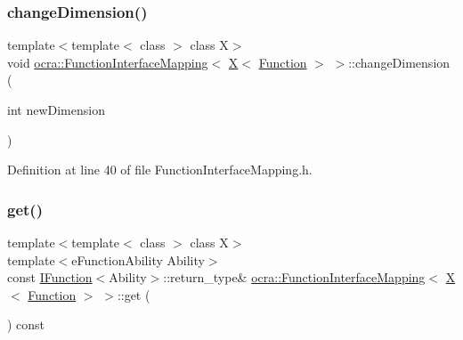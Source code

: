 \hypertarget{structocra_1_1FunctionInterfaceMapping_3_01X_3_01Function_01_4_01_4_aebf253ed862abb394f5586709002252e}{}\label{structocra_1_1FunctionInterfaceMapping_3_01X_3_01Function_01_4_01_4_aebf253ed862abb394f5586709002252e} 
\subsubsection{\texorpdfstring{change\+Dimension()}{changeDimension()}}
{\footnotesize\ttfamily template$<$template$<$ class $>$ class X$>$ \\
void \hyperlink{structocra_1_1FunctionInterfaceMapping}{ocra\+::\+Function\+Interface\+Mapping}$<$ \hyperlink{namespaceocra_a436781c7059a0f76027df1c652126260a53f3cfeeb322946db40cd86dfebfb237}{X}$<$ \hyperlink{classocra_1_1Function}{Function} $>$ $>$\+::change\+Dimension (\begin{DoxyParamCaption}\item[{int}]{new\+Dimension }\end{DoxyParamCaption})\hspace{0.3cm}{\ttfamily [inline]}}



Definition at line 40 of file Function\+Interface\+Mapping.\+h.

\hypertarget{structocra_1_1FunctionInterfaceMapping_3_01X_3_01Function_01_4_01_4_af42a6175afbf22787ab4dd7dab5b0152}{}\label{structocra_1_1FunctionInterfaceMapping_3_01X_3_01Function_01_4_01_4_af42a6175afbf22787ab4dd7dab5b0152} 
\subsubsection{\texorpdfstring{get()}{get()}\hspace{0.1cm}{\footnotesize\ttfamily [1/2]}}
{\footnotesize\ttfamily template$<$template$<$ class $>$ class X$>$ \\
template$<$e\+Function\+Ability Ability$>$ \\
const \hyperlink{classocra_1_1IFunction}{I\+Function}$<$Ability$>$\+::return\+\_\+type\& \hyperlink{structocra_1_1FunctionInterfaceMapping}{ocra\+::\+Function\+Interface\+Mapping}$<$ \hyperlink{namespaceocra_a436781c7059a0f76027df1c652126260a53f3cfeeb322946db40cd86dfebfb237}{X}$<$ \hyperlink{classocra_1_1Function}{Function} $>$ $>$\+::get (\begin{DoxyParamCaption}{ }\end{DoxyParamCaption}) const\hspace{0.3cm}{\ttfamily [inline]}}



